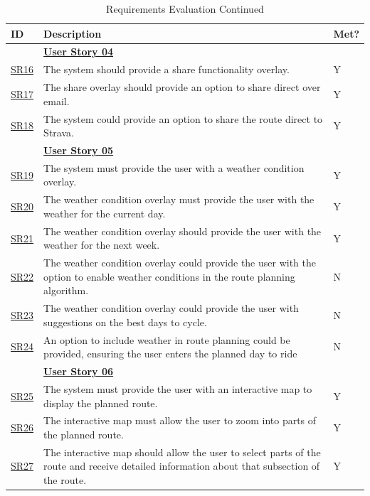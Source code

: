 \begin{table}[!htb]
    \ContinuedFloat
    \caption{Requirements Evaluation Continued}
    \label{evaluatedrqextended}
    \small
    \begin{tabularx}{\textwidth}{ p{1cm} p{11cm} p{1cm} }
        \hline
        ID & Description & Met? \\ 
        \hline
        & \textbf{\hyperref[tab:user-story-04]{User Story 04}}  \\
        \hyperref[SR:16]{SR16} & The system should provide a share functionality overlay. & Y \\
        \hyperref[SR:17]{SR17} & The share overlay should provide an option to share direct over email. & Y\\
        \hyperref[SR:18]{SR18} & The system could provide an option to share the route direct to Strava. & Y\\ 
        \hline
        & \textbf{\hyperref[tab:user-story-05]{User Story 05}} \\
        \hyperref[SR:19]{SR19} & The system must provide the user with a weather condition overlay. & Y \\
        \hyperref[SR:20]{SR20} & The weather condition overlay must provide the user with the weather for the current day. & Y\\
        \hyperref[SR:21]{SR21} & The weather condition overlay should provide the user with the weather for the next week. & Y\\
        \hyperref[SR:22]{SR22} & The weather condition overlay could provide the user with the option to enable weather conditions in the route planning algorithm. & N\\ 
        \hyperref[SR:23]{SR23} & The weather condition overlay could provide the user with suggestions on the best days to cycle. & N\\
        \hyperref[SR:24]{SR24} & An option to include weather in route planning could be provided, ensuring the user enters the planned day to ride & N\\ 
        \hline
        & \textbf{\hyperref[tab:user-story-06]{User Story 06}}  \\
        \hyperref[SR:25]{SR25} & The system must provide the user with an interactive map to display the planned route. & Y \\
        \hyperref[SR:26]{SR26} & The interactive map must allow the user to zoom into parts of the planned route. & Y\\
        \hyperref[SR:27]{SR27} & The interactive map should allow the user to select parts of the route and receive detailed information about that subsection of the route. & Y\\

\end{tabularx}
\end{table}
